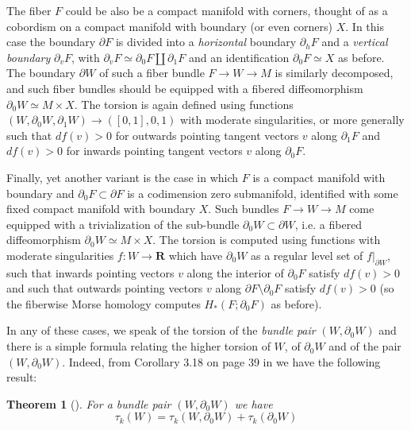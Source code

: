 \documentclass{amsart}
\def\bR{\mathbf{R}}
\newtheorem{theorem}{Theorem}[section]
\theoremstyle{definition}
\theoremstyle{remark}
\newtheorem{inductive lemma}[theorem]{Inductive Lemma}
\begin{document}
The fiber $F$ could be also be a compact manifold with corners, thought of as a cobordism on a compact manifold with boundary (or even corners) $X$. In this case the boundary $\partial F$ is divided into a {\em horizontal }boundary $\partial_h F$ and a {\em vertical boundary} $\partial_v F$, with $\partial_v F \simeq \partial_0 F \coprod \partial_1 F$ and an identification $\partial_0 F \simeq X$ as before. The boundary $\partial W$ of such a fiber bundle $F \to W \to M$ is similarly decomposed, and such fiber bundles should be equipped with a fibered diffeomorphism $\partial_0 W \simeq M \times X$. The torsion is again defined using functions $(W,\partial_0W,\partial_1 W) \to ([0,1],0,1)$ with moderate singularities, or more generally such that $df(v)>0$ for outwards pointing tangent vectors $v$ along $\partial_1 F$ and $df(v)>0$ for inwards pointing tangent vectors $v$ along $\partial_0 F$.

Finally, yet another variant is the case in which $F$ is a compact manifold with boundary and $\partial_0 F \subset \partial F$ is a codimension zero submanifold, identified with some fixed compact manifold with boundary $X$. Such bundles $F \to W \to M$ come equipped with a trivialization of the sub-bundle $\partial_0 W \subset \partial W$, i.e. a fibered diffeomorphism $\partial_0 W \simeq M \times X$. The torsion is computed using functions with moderate singularities $f:W \to \bR$ which have $\partial_0 W$ as a regular level set of $f|_{\partial W}$, such that inwards pointing vectors $v$ along the interior of $\partial_0 F$ satisfy $df(v)>0$ and such that outwards pointing vectors $v$ along  $\partial F \setminus \partial_0 F$ satisfy $df(v)>0$ (so the fiberwise Morse homology computes $H_*(F;\partial_0F)$ as before).

In any of these cases, we speak of the torsion of the {\em bundle pair} $(W,\partial_0W)$ and  there is a simple formula relating the higher torsion of $W$, of $\partial_0 W$ and of the pair $(W,\partial_0W)$. Indeed, from Corollary 3.18 on page 39 in \cite{Igu05} we have the following result:

\begin{theorem}[\cite{Igu05}]\label{thm: relative} For a bundle pair $(W,\partial_0W)$ we have
\[
        \tau_k(W)=\tau_k(W, \partial_0W)+\tau_k(\partial_0W)
\]
\end{theorem}
\end{document}
